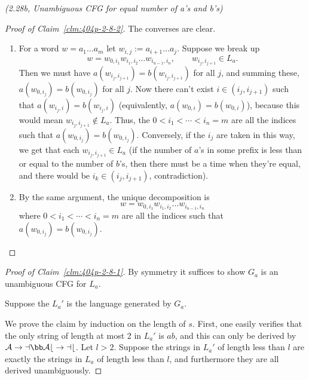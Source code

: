 \begin{problem}{\it (2.28b, Unambiguous CFG for equal number of a's and b's)}
\begin{proof}[Proof of Claim~\ref{clm:404p-2-8-2}]
The converses are clear.
\begin{enumerate}
\item
For a word $w=a_1\ldots a_m$ let $w_{i,j}:=a_{i+1}\ldots a_j$.
Suppose we break up
\[
w=w_{0,i_1}w_{i_1,i_2}\ldots w_{i_{n-1},i_n},\qquad w_{i_j,i_{j+1}}\in L_a.
\]
Then we must have $a(w_{i_j,i_{j+1}})=b(w_{i_j,i_{j+1}})$ for all $j$, and summing these, $a(w_{0,i_j})=b(w_{0,i_j})$ for all $j$. Now there can't exist $i\in (i_j,i_{j+1})$ such that $a(w_{i_j,i})=b(w_{i_j,i})$ (equivalently, $a(w_{0,i})=b(w_{0,i})$), because this would mean $w_{i_j,i_{j+1}}\nin L_a$.
Thus, the $0<i_1<\cdots< i_n=m$ are all the indices such that $a(w_{0,i_j})=b(w_{0,i_j})$. Conversely, if the $i_j$ are taken in this way, we get that each $w_{i_j,i_{j+1}}\in L_a$ (if the number of $a$'s in some prefix is less than or equal to the number of $b$'s, then there must be a time when they're equal, and there would be $i_k\in (i_j,i_{j+1})$, contradiction).
\item
By the same argument, the unique decomposition is
\[
w=w_{0,i_1}w_{i_1,i_2}\ldots w_{i_{n-1},i_n}
\]
where $0<i_1<\cdots< i_n=m$ are all the indices such that $a(w_{0,i_j})=b(w_{0,i_j})$.
\end{enumerate}
\end{proof}

\begin{proof}[Proof of Claim~\ref{clm:404p-2-8-1}]
By symmetry it suffices to show $G_a$ is an unambiguous CFG for $L_a$.

Suppose the $L_a'$ is the language generated by $G_a$.

We prove the claim by induction on the length of $s$. First, one easily verifies that the only string of length at most 2 in $L_a'$ is $ab$, and this can only be derived by $\cal A\to a\bb Ab\to ab$. Let $l>2$. Suppose the strings in $L_a'$ of length less than $l$ are exactly the strings in $L_a$ of length less than $l$, and furthermore they are all derived unambiguously.


\end{proof}
\end{problem}
